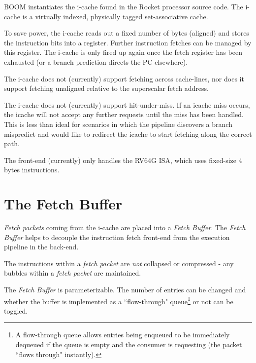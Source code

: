 BOOM instantiates the i-cache found in the Rocket processor source code.  The i-cache is a virtually indexed, physically tagged set-associative cache. 

To save power, the i-cache reads out a fixed number of bytes (aligned) and stores the instruction bits into a register. Further instruction fetches can be managed by this register. The i-cache is only fired up again once the fetch register has been exhausted (or a branch prediction directs the PC elsewhere).  

The i-cache does not (currently) support fetching across cache-lines, nor does it support fetching unaligned relative to the superscalar fetch address.


The i-cache does not (currently) support hit-under-miss.  If an icache miss occurs, the icache will not accept any further requests until the miss has been handled.  This is less than ideal for scenarios in which the pipeline discovers a branch mispredict and would like to redirect the icache to start fetching along the correct path. 



The front-end (currently) only handles the RV64G ISA, which uses fixed-size 4 bytes instructions. 

\section{The Fetch Buffer}

{\em Fetch packets} coming from the i-cache are placed into a {\em Fetch Buffer}.  The {\em Fetch Buffer} helps to decouple the instruction fetch front-end from the execution pipeline in the back-end. 

The instructions within a {\em fetch packet} are {\em not} collapsed or compressed - any bubbles within a {\em fetch packet} are maintained. 

The {\em Fetch Buffer} is parameterizable. The number of entries can be changed and whether the buffer is implemented as a ``flow-through" queue\footnote{A flow-through queue allows entries being enqueued to be immediately dequeued if the queue is empty and the consumer is requesting (the packet ``flows through" instantly).} or not can be toggled.  